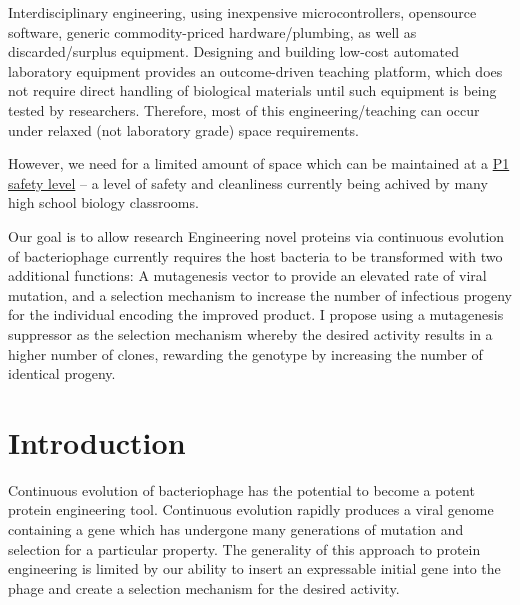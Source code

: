 \documentclass[10pt,letterpaper]{article}
\begin{document}
Interdisciplinary engineering, using inexpensive microcontrollers, opensource software, generic commodity-priced hardware/plumbing, as well as discarded/surplus equipment.
Designing and building low-cost automated laboratory equipment provides an outcome-driven teaching platform, which does not require direct handling of biological materials until such equipment is being tested by researchers. Therefore, most of this engineering/teaching can occur under relaxed (not laboratory grade) space requirements.


However, we need for a limited amount of space which can be maintained at a
\href{http://www.labmanager.com/lab-health-and-safety/2010/12/biosafety-levels-1-2-3-4#.WOuat1RifRY}{P1 safety level}
-- a level of safety and cleanliness currently being achived by many high school biology classrooms.

Our goal is to allow research
Engineering novel proteins via continuous evolution of bacteriophage currently requires the host bacteria to be transformed with two additional functions: A mutagenesis vector to provide an elevated rate of viral mutation, and a selection mechanism to increase the number of infectious progeny for the individual encoding the improved product\cite{pace}.  I propose using a mutagenesis suppressor as the selection mechanism whereby the desired activity results in a higher number of clones, rewarding the genotype by increasing the number of identical progeny.



\section*{Introduction}
Continuous evolution of bacteriophage has the potential to become a potent protein engineering tool\cite{pace}\cite{monsanto}.
Continuous evolution rapidly produces a viral genome containing a gene
which has undergone many generations of mutation and selection for
a particular property.  The generality of this approach to protein engineering
is limited by our ability to insert an expressable initial gene into the phage and create a selection mechanism for the desired activity.
\end{document}

